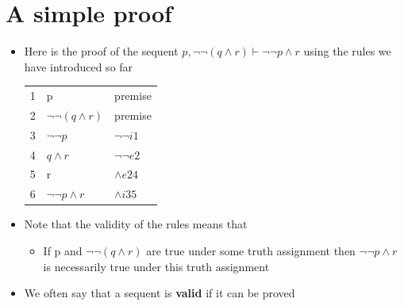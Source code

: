 \documentclass{article}[18pt]
\begin{document}
\section{A simple proof}
\begin{itemize}
\item Here is the proof of the sequent $p,\lnot\lnot (q\land r)\vdash \lnot \lnot p \land r$ using the rules we have introduced so far\\
\begin{tabular}{l l l }
1&p&premise\\
2&$\lnot\lnot (q\land r)$&premise\\
3&$\lnot\lnot p$&$\lnot \lnot i1$\\
4&$q\land r$&$\lnot\lnot e 2$\\
5&r&$\land e2 4$\\
6&$\lnot\lnot p\land r$&$\land i 3 5$ 

\end{tabular}
\item Note that the validity of the rules means that
\begin{itemize}
\item If p and $\lnot \lnot(q\land r)$ are true under some truth assignment then $\lnot \lnot p\land r$ is necessarily true under this truth assignment
\end{itemize}
\item We often say that a sequent is \textbf{valid} if it can be proved
\end{itemize}
\end{document}
